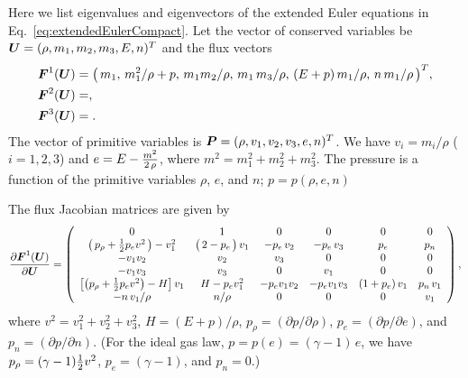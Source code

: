 \documentclass[10pt,preprint]{aastex}
\begin{document}
Here we list eigenvalues and eigenvectors of the extended Euler equations in Eq.~\eqref{eq:extendedEulerCompact}.  
Let the vector of conserved variables be $\boldsymbol{U}=(\rho,m_{1},m_{2},m_{3},E,n)^{T}$ and the flux vectors
\begin{align}
  \boldsymbol{F}^{1}(\boldsymbol{U})
  &=\big(\,m_{1},\,m_{1}^{2}/\rho+p,\,m_{1}m_{2}/\rho,\,m_{1}\,m_{3}/\rho,\,(E+p)\,m_{1}/\rho,\,n\,m_{1}/\rho\,\big)^{T}, \\
  \boldsymbol{F}^{2}(\boldsymbol{U})
  &=, \\
  \boldsymbol{F}^{3}(\boldsymbol{U})
  &=.
\end{align}
The vector of primitive variables is $\boldsymbol{P}=(\rho,v_{1},v_{2},v_{3},e,n)^{T}$.  
We have $v_{i}=m_{i}/\rho$ ($i=1,2,3$) and $e=E-\frac{m^{2}}{2\,\rho}$, where $m^{2}=m_{1}^{2}+m_{2}^{2}+m_{3}^{2}$.  
The pressure is a function of the primitive variables $\rho$, $e$, and $n$; $p=p(\rho,e,n)$

The flux Jacobian matrices are given by
\begin{align}
  \frac{\partial \boldsymbol{F}^{1}(\boldsymbol{U})}{\partial \boldsymbol{U}}
  =
  \left(
  \begin{array}{cccccc}
  0 & 1 & 0 & 0 & 0 & 0 \\
  \big(\,p_{\rho}+\frac{1}{2}p_{e}v^{2}\,\big)-v_{1}^{2} & \big(\,2-p_{e}\,\big)\,v_{1} & -p_{e}\,v_{2} & -p_{e}\,v_{3} & p_{e} & p_{n} \\
  - v_{1}v_{2} & v_{2} & v_{3} & 0 & 0 & 0 \\
  - v_{1}v_{3} & v_{3} & 0 & v_{1} & 0 & 0 \\
  \big[\big(p_{\rho}+\frac{1}{2}p_{e}v^{2}\big)-H\big]\,v_{1} & H-p_{e}v_{1}^{2} & -p_{e}v_{1}v_{2} & -p_{e}v_{1}v_{3} & (1+p_{e})\,v_{1} & p_{n}\,v_{1} \\
  -n\,v_{1}/\rho & n/\rho & 0 & 0 & 0 & v_{1}
  \end{array}
  \right),
\end{align}
where $v^{2}=v_{1}^{2}+v_{2}^{2}+v_{3}^{2}$, $H=(E+p)/\rho$, $p_{\rho}=(\partial p/\partial \rho)$, $p_{e}=(\partial p/\partial e)$, and $p_{n}=(\partial p/\partial n)$.  
(For the ideal gas law, $p=p(e)=(\gamma-1)\,e$, we have $p_{\rho}=(\gamma-1)\frac{1}{2}v^{2}$, $p_{e}=(\gamma-1)$, and $p_{n}=0$.)
\end{document}
